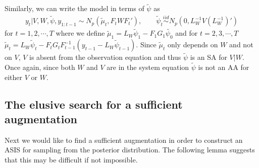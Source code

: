 \documentclass[12pt]{article}
\begin{document}
Similarly, we can write the model in terms of $\tilde{\psi}$ as
\begin{align*}
  y_t|V,W,\tilde{\psi},y_{1:t-1} \sim N_p(\tilde{\mu}_t, F_tWF_t'), \qquad 
  \tilde{\psi}_t  \stackrel{iid}{\sim} N_p(0,L_W^{-1}V(L_W^{-1})')
\end{align*}
for $t=1,2,\cdots,T$ where we define $\tilde{\mu}_1 = L_W\tilde{\psi}_1 - F_1G_1\tilde{\psi_0}$ and for $t=2,3,\cdots,T$ $\tilde{\mu}_t =L_W\tilde{\psi}_t - F_tG_tF_{t-1}^{-1}(y_{t-1} - L_{W}\tilde{\psi}_{t-1})$. Since $\tilde{\mu}_t$ only depends on $W$ and not on $V$, $V$ is absent from the observation equation and thus $\tilde{\psi}$ is an SA for $V|W$. Once again, since both $W$ and $V$ are in the system equation $\tilde{\psi}$ is not an AA for either $V$ or $W$.

\subsection{The elusive search for a sufficient augmentation}

Next we would like to find a sufficient augmentation in order to construct an ASIS for sampling from the posterior distribution. The following lemma suggests that this may be difficult if not impossible.
\end{document}
